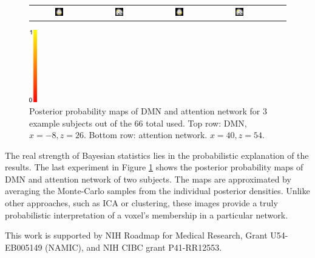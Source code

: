 \documentclass[runningheads,a4paper]{llncs}
\begin{document}
\begin{figure}[htb]
\begin{tabular}[b]{cc|cc|cc}
\includegraphics[width=0.15\textwidth]{figure3/atten_sub17_a} &
\includegraphics[width=0.15\textwidth]{figure3/atten_sub17_s} &
\includegraphics[width=0.15\textwidth]{figure3/atten_sub21_a} &
\includegraphics[width=0.15\textwidth]{figure3/atten_sub21_s} 
\end{tabular}
\includegraphics[width=0.03\textwidth]{figure3/colorbar}
\caption{Posterior probability maps of DMN and attention network for 3 example
  subjects out of the 66 total used. Top row: DMN, $x = -8, z=26$. Bottom row:
  attention network. $x=40, z=54$.}
\label{fig:fig3}
\end{figure}

The real strength of Bayesian statistics lies in the probabilistic explanation of
the results. The last experiment in Figure \ref{fig:fig3} shows the posterior
probability maps of DMN and attention network of two subjects. The maps are approximated by averaging the Monte-Carlo samples from the individual
posterior densities. Unlike other approaches, such as ICA or clustering,
these images provide a truly probabilistic interpretation of a voxel's
membership in a particular network.


 This work is supported by NIH Roadmap for Medical Research, Grant U54-EB005149 (NAMIC), and NIH CIBC grant P41-RR12553. 


\end{document}
